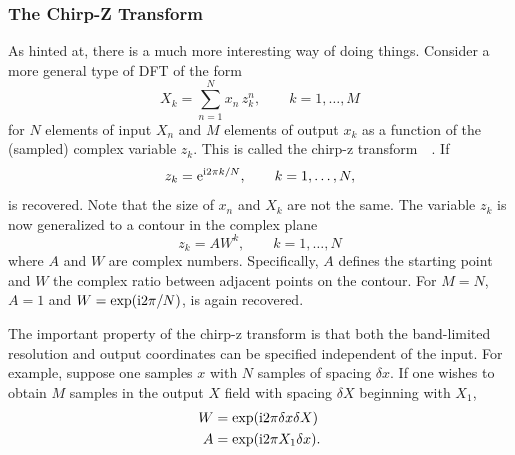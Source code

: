 \subsubsection{The Chirp-Z Transform}
As hinted at, there is a much more interesting way of doing things.
Consider a more general type of DFT of the form
\begin{equation}
  X_k = \sum_{n=1}^{N} x_n\, z_k^n, \qquad k=1,\ldots,M
  \label{eqn:czt}
\end{equation}
for $N$ elements of input $X_n$ and $M$ elements of output $x_k$ as a
function of the (sampled) complex variable  $z_k$.  This is called the
chirp-z transform~\cite{rabiner1969chirp}~\cite{rabiner1969chirp2}.
If
\begin{equation}
  z_k = {\mathrm{e}}^{{\mathrm{i}} 2\pi k/N}, \qquad k=1,\ldots,N,
\end{equation}
 is recovered.  Note that the size of $x_n$ and $X_k$
are not the same.  The variable $z_k$ is now generalized to a contour in the complex plane
\begin{equation}
  z_k = A W^k, \qquad k=1,\ldots,N
\end{equation}
where $A$ and $W$ are complex numbers.  Specifically, $A$ defines the
starting point and $W$ the complex ratio between adjacent points on the
contour.  For $M=N$, $A=1$ and $W=\exp({\mathrm{i}} 2 \pi/N)$, 
is again recovered.

The important property of the chirp-z transform is that both the
band-limited resolution and output coordinates can be specified independent of the input.
For example, suppose one samples $x$ with $N$ samples
of spacing $\delta x$.  If one wishes to obtain $M$ samples in the output
$X$ field with spacing $\delta X$ beginning with $X_1$,
\begin{align}
  W & =\exp({\mathrm{i}} 2 \pi \delta x \delta X) \\
  A & =\exp({\mathrm{i}} 2 \pi X_1 \delta x).
\end{align}


